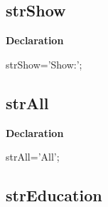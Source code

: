 \documentclass{report}
\newif\ifpdf
\begin{document}
\subsection*{strShow}
\fi
\label{trstrings-strShow}
\begin{list}{}{
\setlength{\itemindent}{0cm}
\setlength{\listparindent}{0cm}
\setlength{\leftmargin}{\evensidemargin}
\addtolength{\leftmargin}{\tmplength}
\settowidth{\labelsep}{X}
\addtolength{\leftmargin}{\labelsep}
\setlength{\labelwidth}{\tmplength}
}
\item[\textbf{Declaration}\hfill]
\ifpdf
\begin{flushleft}
\fi
\begin{ttfamily}
strShow='Show:';\end{ttfamily}

\ifpdf
\end{flushleft}
\fi

\end{list}
\ifpdf
\subsection*{\large{\textbf{strAll}}\normalsize\hspace{1ex}\hrulefill}
\else
\subsection*{strAll}
\fi
\label{trstrings-strAll}
\begin{list}{}{
\setlength{\itemindent}{0cm}
\setlength{\listparindent}{0cm}
\setlength{\leftmargin}{\evensidemargin}
\addtolength{\leftmargin}{\tmplength}
\settowidth{\labelsep}{X}
\addtolength{\leftmargin}{\labelsep}
\setlength{\labelwidth}{\tmplength}
}
\item[\textbf{Declaration}\hfill]
\ifpdf
\begin{flushleft}
\fi
\begin{ttfamily}
strAll='All';\end{ttfamily}

\ifpdf
\end{flushleft}
\fi

\end{list}
\ifpdf
\subsection*{\large{\textbf{strEducation}}\normalsize\hspace{1ex}\hrulefill}
\else
\end{document}
